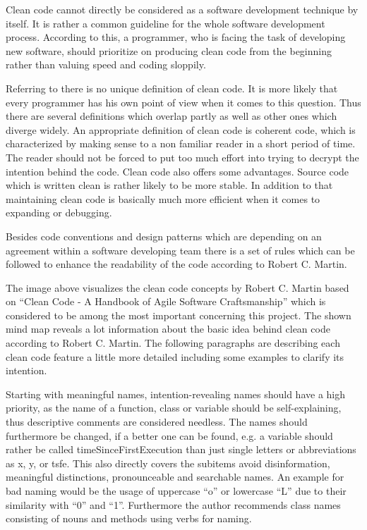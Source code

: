Clean code cannot directly be considered as a software development technique by itself. It is rather a common guideline for the whole 
software development process. According to this, a programmer, who is facing the task of developing new software, should prioritize on 
producing clean code from the beginning rather than valuing speed and coding sloppily.

Referring to \cite{CLEANCODE} there is no unique definition of clean code. It is more likely that every programmer has his own point of 
view when it comes to this question. Thus there are several definitions which overlap partly as well as other ones which diverge widely. 
An appropriate definition of clean code is coherent code, which is characterized by making sense to a non familiar reader in a short period 
of time. The reader should not be forced to put too much effort into trying to decrypt the intention behind the code. Clean code also offers 
some advantages. Source code which is written clean is rather likely to be more stable. In addition to that maintaining clean code is basically 
much more efficient when it comes to expanding or debugging.

Besides code conventions and design patterns which are depending on an agreement within a software developing team there is a set of rules
which can be followed to enhance the readability of the code according to Robert C. Martin.


The image above visualizes the clean code concepts by Robert C. Martin based on “Clean Code - A Handbook of Agile Software Craftsmanship” 
which is considered to be among the most important concerning this project. The shown mind map reveals a lot information about the basic 
idea behind clean code according to Robert C. Martin. The following paragraphs are describing each clean code feature a little more detailed 
including some examples to clarify its intention.

Starting with meaningful names, intention-revealing names should have a high priority, as the name of a function, class or variable should 
be self-explaining, thus descriptive comments are considered needless. The names should furthermore be changed, if a better one can be found, 
e.g. a variable should rather be called timeSinceFirstExecution than just single letters or abbreviations as x, y, or tsfe. This also directly 
covers the subitems avoid disinformation, meaningful distinctions, pronounceable and searchable names. An example for bad naming would be the 
usage of uppercase “o” or lowercase “L” due to their similarity with “0” and “1”. Furthermore the author recommends class names consisting of 
nouns and methods using verbs for naming.

